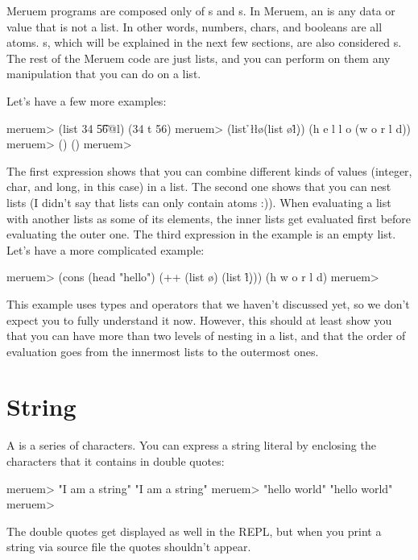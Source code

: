 Meruem programs are composed only of s and s. In Meruem, an  is any data or value that is not a list. In other words, numbers, chars, and booleans are all atoms. s, which will be explained in the next few sections, are also considered s. The rest of the Meruem code are just lists, and you can perform on them any manipulation that you can do on a list.

Let's have a few more examples:

\begin{REPL}
meruem> (list 34 \t 56@l) 
(34 t 56)
meruem> (list \h \e \l \l \o (list \w \o \r \l \d))
(h e l l o (w o r l d))
meruem> ()
()
meruem> 
\end{REPL}

The first expression shows that you can combine different kinds of values (integer, char, and long, in this case) in a list. The second one shows that you can nest lists (I didn't say that lists can only contain atoms :)). When evaluating a list with another lists as some of its elements, the inner lists get evaluated first before evaluating the outer one. The third expression in the example is an empty list. Let's have a more complicated example:

\begin{REPL}
meruem> (cons (head "hello") (++ (list \w \o) (list \r \l \d)))     
(h w o r l d)
meruem>
\end{REPL}

This example uses types and operators that we haven't discussed yet, so we don't expect you to fully understand it now. However, this should at least show you that you can have more than two levels of nesting in a list, and that the order of evaluation goes from the innermost lists to the outermost ones.

\section{String}
A  is a series of characters. You can express a string literal by enclosing the characters that it contains in double quotes:

\begin{REPL}
meruem> "I am a string"
"I am a string"
meruem> "hello world"
"hello world"
meruem> 
\end{REPL}

The double quotes get displayed as well in the REPL, but when you print a string via source file the quotes shouldn't appear. 

